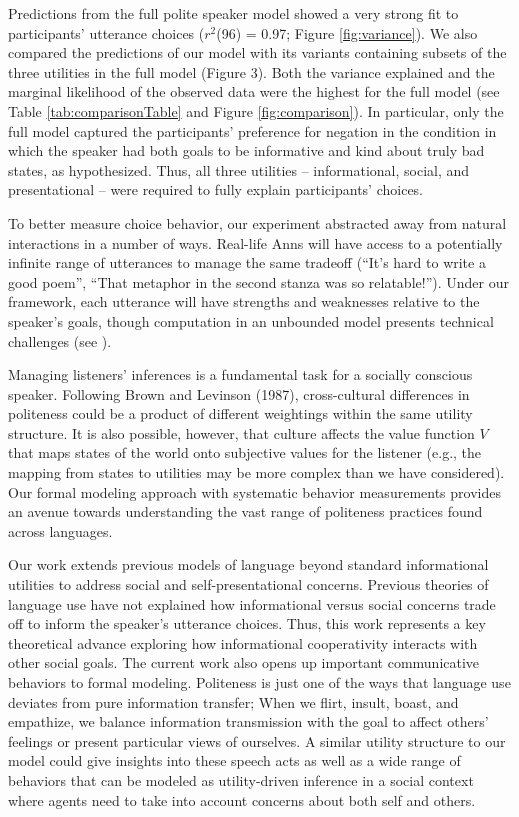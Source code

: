 \documentclass[12pt]{article}
\begin{document}
Predictions from the full polite speaker model showed a very strong fit
to participants' utterance choices (\(r^2\)(96) = 0.97; Figure
\ref{fig:variance}). We also compared the predictions of our model with
its variants containing subsets of the three utilities in the full model
(Figure 3). Both the variance explained and the marginal likelihood of
the observed data were the highest for the full model (see Table
\ref{tab:comparisonTable} and Figure \ref{fig:comparison}). In
particular, only the full model captured the participants' preference
for negation in the condition in which the speaker had both goals to be
informative and kind about truly bad states, as hypothesized. Thus, all
three utilities -- informational, social, and presentational -- were
required to fully explain participants' choices.


To better measure choice behavior, our experiment abstracted away from
natural interactions in a number of ways. Real-life Anns will have
access to a potentially infinite range of utterances to manage the same
tradeoff (\enquote{It's hard to write a good poem}, \enquote{That
metaphor in the second stanza was so relatable!}). Under our framework,
each utterance will have strengths and weaknesses relative to the
speaker's goals, though computation in an unbounded model presents
technical challenges (see \cite{goodman2016}).

Managing listeners' inferences is a fundamental task for a socially
conscious speaker. Following Brown and Levinson (1987), cross-cultural
differences in politeness could be a product of different weightings
within the same utility structure. It is also possible, however, that
culture affects the value function \(V\) that maps states of the world
onto subjective values for the listener (e.g., the mapping from states
to utilities may be more complex than we have considered). Our formal
modeling approach with systematic behavior measurements provides an
avenue towards understanding the vast range of politeness practices
found across languages.

Our work extends previous models of language beyond standard
informational utilities to address social and self-presentational
concerns. Previous theories of language use have not explained how
informational versus social concerns trade off to inform the speaker's
utterance choices. Thus, this work represents a key theoretical advance
exploring how informational cooperativity interacts with other social
goals. The current work also opens up important communicative behaviors
to formal modeling. Politeness is just one of the ways that language use
deviates from pure information transfer; When we flirt, insult, boast,
and empathize, we balance information transmission with the goal to
affect others' feelings or present particular views of ourselves. A
similar utility structure to our model could give insights into these
speech acts as well as a wide range of behaviors that can be modeled as
utility-driven inference in a social context \cite{baker2017rational, hamlin2013mentalistic} 
where agents need to take into account concerns about both self
and others.
\end{document}
